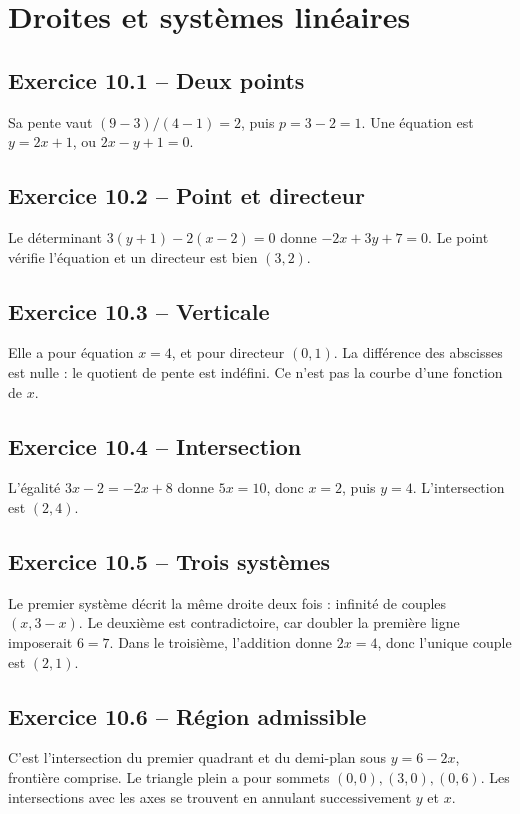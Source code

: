 \chapter{Droites et systèmes linéaires}
\section*{Exercice 10.1 -- Deux points}
Sa pente vaut $(9-3)/(4-1)=2$, puis $p=3-2=1$. Une équation est $y=2x+1$, ou $2x-y+1=0$.

\section*{Exercice 10.2 -- Point et directeur}
Le déterminant $3(y+1)-2(x-2)=0$ donne $-2x+3y+7=0$. Le point vérifie l'équation et un directeur est bien $(3,2)$.

\section*{Exercice 10.3 -- Verticale}
Elle a pour équation $x=4$, et pour directeur $(0,1)$. La différence des abscisses est nulle : le quotient de pente est indéfini. Ce n'est pas la courbe d'une fonction de $x$.

\section*{Exercice 10.4 -- Intersection}
L'égalité $3x-2=-2x+8$ donne $5x=10$, donc $x=2$, puis $y=4$. L'intersection est $(2,4)$.

\section*{Exercice 10.5 -- Trois systèmes}
Le premier système décrit la même droite deux fois : infinité de couples $(x,3-x)$. Le deuxième est contradictoire, car doubler la première ligne imposerait $6=7$. Dans le troisième, l'addition donne $2x=4$, donc l'unique couple est $(2,1)$.

\section*{Exercice 10.6 -- Région admissible}
C'est l'intersection du premier quadrant et du demi-plan sous $y=6-2x$, frontière comprise. Le triangle plein a pour sommets $(0,0),(3,0),(0,6)$. Les intersections avec les axes se trouvent en annulant successivement $y$ et $x$.
